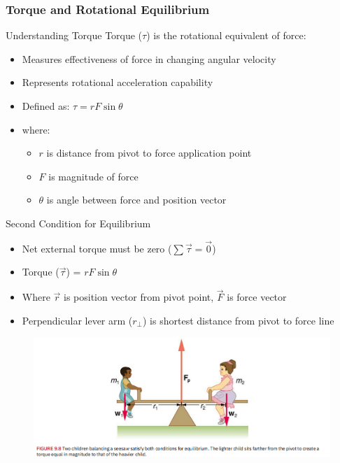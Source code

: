\documentclass{beamer}
\begin{document}
\begin{frame}
\frametitle{Torque and Rotational Equilibrium}

\begin{block}{Understanding Torque}
Torque ($\tau$) is the rotational equivalent of force:
\begin{itemize}
    \item Measures effectiveness of force in changing angular velocity
    \item Represents rotational acceleration capability
    \item Defined as: $\tau = rF\sin\theta$
    \item where:
    \begin{itemize}
        \item $r$ is distance from pivot to force application point
        \item $F$ is magnitude of force
        \item $\theta$ is angle between force and position vector
    \end{itemize}
\end{itemize}
\end{block}
\end{frame}
\begin{frame}
\begin{block}{Second Condition for Equilibrium}
\begin{itemize}
    \item Net external torque must be zero ($\sum \vec{\tau} = \vec{0}$)
    \item Torque ($\vec{\tau}$) = $rF \sin \theta$
    \item Where $\vec{r}$ is position vector from pivot point, $\vec{F}$ is force vector
    \item Perpendicular lever arm ($r_\perp$) is shortest distance from pivot to force line
\end{itemize}
\end{block}

\begin{figure}
    \centering
    \includegraphics[width=1\linewidth]{CH9/Screenshot 2024-11-04 120123.png}
\end{figure}
\end{frame}
\end{document}

